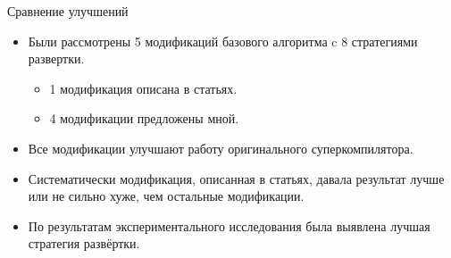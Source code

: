 \documentclass[xcolor=table]{beamer}
\begin{document}
%
\begin{frame}{Сравнение улучшений}

\begin{itemize}
\item Были рассмотрены 5 модификаций базового алгоритма
      c 8 стратегиями развертки.
      \begin{itemize}
      \item 1 модификация описана в статьях.
      \item 4 модификации предложены мной.
      \end{itemize}
\item Все модификации улучшают работу оригинального суперкомпилятора.
\item Систематически модификация, описанная в статьях, давала
      результат лучше или не сильно хуже, чем остальные модификации.
\item По результатам экспериментального исследования была выявлена
      лучшая стратегия развёртки.
\end{itemize}

\end{frame}
%
\end{document}
